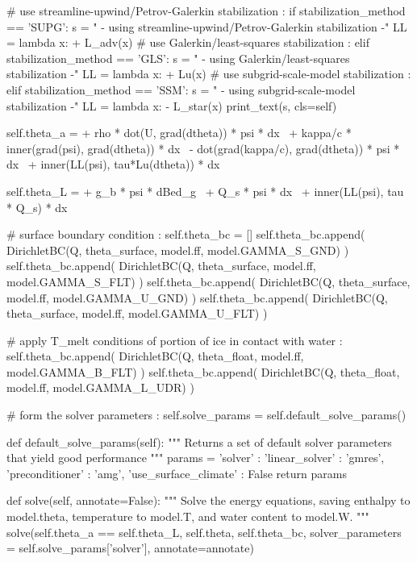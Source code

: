 \begin{python}[label=cslvr_enthalpy, caption={\CSLVR source code contained in the \texttt{Enthalpy} class.}]
# use streamline-upwind/Petrov-Galerkin stabilization : 
if stabilization_method == 'SUPG':
  s      = "    - using streamline-upwind/Petrov-Galerkin stabilization -"
  LL     = lambda x: + L_adv(x)
# use Galerkin/least-squares stabilization :
elif stabilization_method == 'GLS':
  s      = "    - using Galerkin/least-squares stabilization -"
  LL     = lambda x: + Lu(x)
# use subgrid-scale-model stabilization :
elif stabilization_method == 'SSM':
  s      = "    - using subgrid-scale-model stabilization -"
  LL     = lambda x: - L_star(x)
print_text(s, cls=self)

self.theta_a = + rho * dot(U, grad(dtheta)) * psi * dx \
               + kappa/c * inner(grad(psi), grad(dtheta)) * dx \
               - dot(grad(kappa/c), grad(dtheta)) * psi * dx \
               + inner(LL(psi), tau*Lu(dtheta)) * dx

self.theta_L = + g_b * psi * dBed_g \
               + Q_s * psi * dx \
               + inner(LL(psi), tau * Q_s) * dx

# surface boundary condition : 
self.theta_bc = []
self.theta_bc.append( DirichletBC(Q, theta_surface, 
                                  model.ff, model.GAMMA_S_GND) )
self.theta_bc.append( DirichletBC(Q, theta_surface,
                                  model.ff, model.GAMMA_S_FLT) )
self.theta_bc.append( DirichletBC(Q, theta_surface, 
                                  model.ff, model.GAMMA_U_GND) )
self.theta_bc.append( DirichletBC(Q, theta_surface,
                                  model.ff, model.GAMMA_U_FLT) )

# apply T_melt conditions of portion of ice in contact with water :
self.theta_bc.append( DirichletBC(Q, theta_float, 
                                  model.ff, model.GAMMA_B_FLT) )
self.theta_bc.append( DirichletBC(Q, theta_float, 
                                  model.ff, model.GAMMA_L_UDR) )

# form the solver parameters :
self.solve_params = self.default_solve_params()

def default_solve_params(self):
  """ 
  Returns a set of default solver parameters that yield good performance
  """
  params  = {'solver' : {'linear_solver'       : 'gmres',
                         'preconditioner'      : 'amg'},
             'use_surface_climate' : False}
  return params

def solve(self, annotate=False):
  """ 
  Solve the energy equations, saving enthalpy to model.theta, temperature 
  to model.T, and water content to model.W.
  """
  solve(self.theta_a == self.theta_L, self.theta, self.theta_bc,
        solver_parameters = self.solve_params['solver'], annotate=annotate)
\end{python}



